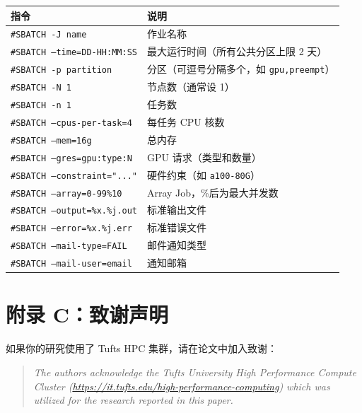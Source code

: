 \begin{table}[h]
\centering
\small
\begin{tabular}{lp{9cm}}
\toprule
指令 & 说明 \\
\midrule
\texttt{\#SBATCH -J name} & 作业名称 \\
\texttt{\#SBATCH --time=DD-HH:MM:SS} & 最大运行时间（所有公共分区上限 2 天） \\
\texttt{\#SBATCH -p partition} & 分区（可逗号分隔多个，如 \texttt{gpu,preempt}） \\
\texttt{\#SBATCH -N 1} & 节点数（通常设 1） \\
\texttt{\#SBATCH -n 1} & 任务数 \\
\texttt{\#SBATCH --cpus-per-task=4} & 每任务 CPU 核数 \\
\texttt{\#SBATCH --mem=16g} & 总内存 \\
\texttt{\#SBATCH --gres=gpu:type:N} & GPU 请求（类型和数量） \\
\texttt{\#SBATCH --constraint="..."} & 硬件约束（如 \texttt{a100-80G}） \\
\texttt{\#SBATCH --array=0-99\%10} & Array Job，\%后为最大并发数 \\
\texttt{\#SBATCH --output=\%x.\%j.out} & 标准输出文件 \\
\texttt{\#SBATCH --error=\%x.\%j.err} & 标准错误文件 \\
\texttt{\#SBATCH --mail-type=FAIL} & 邮件通知类型 \\
\texttt{\#SBATCH --mail-user=email} & 通知邮箱 \\
\bottomrule
\end{tabular}
\end{table}
\section{附录 C：致谢声明}

如果你的研究使用了 Tufts HPC 集群，请在论文中加入致谢：

\begin{quote}
\textit{The authors acknowledge the Tufts University High Performance Compute Cluster (\url{https://it.tufts.edu/high-performance-computing}) which was utilized for the research reported in this paper.}
\end{quote}


